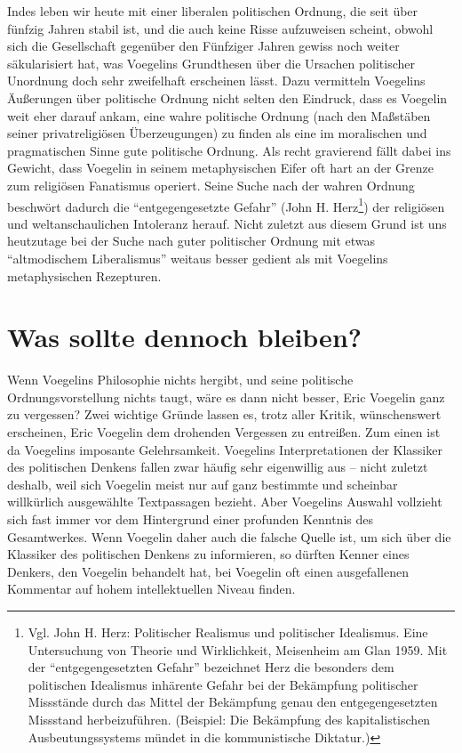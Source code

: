 Indes leben wir heute mit einer liberalen politischen Ordnung, die seit
über fünfzig Jahren stabil ist, und die auch keine Risse aufzuweisen scheint,
obwohl sich die Gesellschaft gegenüber den Fünfziger Jahren gewiss noch
weiter säkularisiert hat, was Voegelins Grundthesen über die Ursachen
politischer Unordnung doch sehr zweifelhaft erscheinen lässt. Dazu
vermitteln Voegelins Äußerungen über politische Ordnung nicht selten den
Eindruck, dass es Voegelin weit eher darauf ankam, eine wahre politische
Ordnung (nach den Maßstäben seiner privatreligiösen Überzeugungen) zu
finden als eine im moralischen und pragmatischen Sinne gute politische
Ordnung. Als recht gravierend fällt dabei ins Gewicht, dass Voegelin in
seinem metaphysischen Eifer oft hart an der Grenze zum religiösen
Fanatismus operiert. Seine Suche nach der wahren Ordnung beschwört
dadurch die "`entgegengesetzte Gefahr"' (John H.  Herz\footnote{Vgl.
  John H. Herz: Politischer Realismus und politischer Idealismus.  Eine
  Untersuchung von Theorie und Wirklichkeit, Meisenheim am Glan 1959.
  Mit der "`entgegengesetzten Gefahr"' bezeichnet Herz die besonders dem
  politischen Idealismus inhärente Gefahr bei der Bekämpfung politischer
  Missstände durch das Mittel der Bekämpfung genau den entgegengesetzten
  Missstand herbeizuführen. (Beispiel: Die Bekämpfung des
  kapitalistischen Ausbeutungssystems mündet in die kommunistische
  Diktatur.)}) der religiösen und weltanschaulichen Intoleranz herauf.
Nicht zuletzt aus diesem Grund ist uns heutzutage bei der Suche nach
guter politischer Ordnung mit etwas "`altmodischem Liberalismus"' weitaus
besser gedient als mit Voegelins metaphysischen Rezepturen.

\section{Was sollte dennoch bleiben?}

Wenn Voegelins Philosophie nichts hergibt, und seine politische
Ordnungsvorstellung nichts taugt, wäre es dann nicht besser, Eric Voegelin
ganz zu vergessen? Zwei wichtige Gründe lassen es, trotz aller Kritik,
wünschenswert erscheinen, Eric Voegelin dem drohenden Vergessen zu entreißen.
Zum einen ist da Voegelins imposante Gelehrsamkeit. Voegelins Interpretationen
der Klassiker des politischen Denkens fallen zwar häufig sehr eigenwillig aus
 -- nicht zuletzt deshalb, weil sich Voegelin meist nur auf ganz bestimmte und
scheinbar willkürlich ausgewählte Textpassagen bezieht. Aber Voegelins Auswahl
vollzieht sich fast immer vor dem Hintergrund einer profunden Kenntnis des
Gesamtwerkes. Wenn Voegelin daher auch die falsche Quelle ist, um sich über
die Klassiker des politischen Denkens zu informieren, so dürften Kenner eines
Denkers, den Voegelin behandelt hat, bei Voegelin oft einen
ausgefallenen Kommentar auf hohem intellektuellen Niveau finden. 

